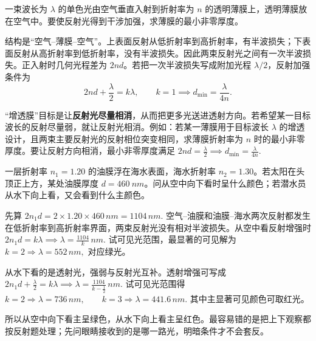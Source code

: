 \documentclass[lang=cn,11pt]{elegantbook}
\begin{document}
\begin{exercise}
一束波长为 \(\lambda\) 的单色光由空气垂直入射到折射率为 \(n\) 的透明薄膜上，透明薄膜放在空气中。要使反射光得到干涉加强，求薄膜的最小非零厚度。
\end{exercise}

\begin{solution}
结构是“空气--薄膜--空气”。上表面反射从低折射率到高折射率，有半波损失；下表面反射从高折射率到低折射率，没有半波损失。因此两束反射光之间有一次半波损失。正入射时几何光程差为 \(2nd\)。若把一次半波损失写成附加光程 \(\lambda/2\)，反射加强条件为
 \[2nd+\frac{\lambda}{2}=k\lambda,\qquad k=1 \implies d_{\min}=\frac{\lambda}{4n}.\] 
\end{solution}

\begin{definition}[增透膜与增反膜]
    “增透膜”目标是让\textbf{反射光尽量相消}，从而把更多光送进透射方向。若希望某一目标波长的反射尽量弱，就让反射光相消。例如：若某一薄膜用于目标波长 \(\lambda\) 的增透设计，且两束主要反射光的反射相位突变相同，求薄膜折射率为 \(n\) 时的最小非零厚度。要让反射方向相消，最小非零厚度满足 \(2nd=\frac{\lambda}{2}\implies d_{\min}=\frac{\lambda}{4n}.\) 
\end{definition}


\begin{exercise}[油膜上下观察时为什么会看到不同颜色]
一层折射率 \(n_1=1.20\) 的油膜浮在海水表面，海水折射率 \(n_2=1.30\)。若太阳在头顶正上方，某处油膜厚度 \(d=\SI{460}{nm}\)。问从空中向下看时呈什么颜色；若潜水员从水下向上看，又会看到什么主颜色。
\end{exercise}
\begin{solution}
先算
 \(2n_1d=2\times1.20\times460\,\si{nm}=1104\,\si{nm}.\) 
空气--油膜和油膜--海水两次反射都发生在低折射率到高折射率界面，两束反射光没有相对半波损失。从空中看反射增强时
 \(2n_1d=k\lambda \implies \lambda=\frac{1104}{k}\,\si{nm}.\) 
试可见光范围，最显著的可见解为
 \(k=2\Rightarrow \lambda=552\,\si{nm},\) 
对应绿光。

从水下看的是透射光，强弱与反射光互补。透射增强可写成
 \(2n_1d+\frac{\lambda}{2}=k\lambda \implies \lambda=\frac{1104}{k-\frac12}\,\si{nm}.\) 
试可见光范围得
 \(k=2\Rightarrow \lambda=736\,\si{nm},\qquad k=3\Rightarrow \lambda=441.6\,\si{nm}.\) 
其中主显著可见颜色可取红光。

所以从空中向下看主呈绿色，从水下向上看主呈红色。最容易错的是把上下观察都按反射题处理；先问眼睛接收到的是哪一路光，明暗条件才不会套反。
\end{solution}
\end{document}
